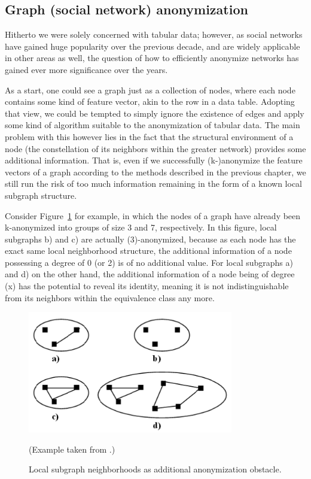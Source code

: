 \documentclass{llncs}
\begin{document}
\subsection{Graph (social network) anonymization}
\label{ssect:graph_sn_anon}

Hitherto we were solely concerned with tabular data; however, as social networks have gained huge popularity over the previous decade, and are widely applicable in other areas as well, the question of how to efficiently anonymize networks has gained ever more significance over the years.

As a start, one could see a graph just as a collection of nodes, where each node contains some kind of feature vector, akin to the row in a data table. Adopting that view, we could be tempted to simply ignore the existence of edges and apply some kind of algorithm suitable to the anonymization of tabular data. The main problem with this however lies in the fact that the structural environment of a node (the constellation of its neighbors within the greater network) provides some additional information. That is, even if we successfully (k-)anonymize the feature vectors of a graph according to the methods described in the previous chapter, we still run the risk of too much information remaining in the form of a known local subgraph structure.

Consider Figure~\ref{fig:anon_sn_problem} for example, in which the nodes of a graph have already been k-anonymized into groups of size 3 and 7, respectively. In this figure, local subgraphs b) and c) are actually (3)-anonymized, because as each node has the exact same local neighborhood structure, the additional information of a node possessing a degree of 0 (or 2) is of no additional value. For local subgraphs a) and d) on the other hand, the additional information of a node being of degree (x) has the potential to reveal its identity, meaning it is not indistinguishable from its neighbors within the equivalence class any more.

\begin{figure}[!t]
	\begin{center}
		\includegraphics[width=0.8\textwidth]{figures/anonym/sn_problem}
		\caption{Local subgraph neighborhoods as additional anonymization obstacle.}
		\label{fig:anon_sn_problem}
	\end{center}
	\small
	(Example taken from \cite{campan2009data}.)
\end{figure}
\end{document}
